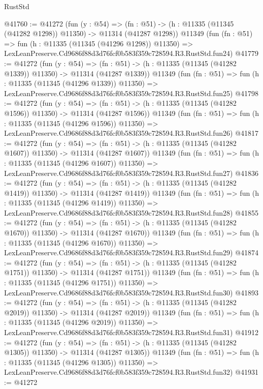 \begin{lexlean}{RustStd}
\begin{coremodule}
@41760 := @41272
    (fun (y : @54) =>
    (fn : @51) -> (h : @11335 (@11345 (@41282 @1298)) @11350) -> @11314 (@41287 @1298))
    @11349
    (fun (fn : @51) =>
    fun (h : @11335 (@11345 (@41296 @1298)) @11350) =>
    LexLeanPreserve.Cd9686f88d3d76fcf0b583f359c728594.R3.RustStd.fun24)
@41779 := @41272
    (fun (y : @54) =>
    (fn : @51) -> (h : @11335 (@11345 (@41282 @1339)) @11350) -> @11314 (@41287 @1339))
    @11349
    (fun (fn : @51) =>
    fun (h : @11335 (@11345 (@41296 @1339)) @11350) =>
    LexLeanPreserve.Cd9686f88d3d76fcf0b583f359c728594.R3.RustStd.fun25)
@41798 := @41272
    (fun (y : @54) =>
    (fn : @51) -> (h : @11335 (@11345 (@41282 @1596)) @11350) -> @11314 (@41287 @1596))
    @11349
    (fun (fn : @51) =>
    fun (h : @11335 (@11345 (@41296 @1596)) @11350) =>
    LexLeanPreserve.Cd9686f88d3d76fcf0b583f359c728594.R3.RustStd.fun26)
@41817 := @41272
    (fun (y : @54) =>
    (fn : @51) -> (h : @11335 (@11345 (@41282 @1607)) @11350) -> @11314 (@41287 @1607))
    @11349
    (fun (fn : @51) =>
    fun (h : @11335 (@11345 (@41296 @1607)) @11350) =>
    LexLeanPreserve.Cd9686f88d3d76fcf0b583f359c728594.R3.RustStd.fun27)
@41836 := @41272
    (fun (y : @54) =>
    (fn : @51) -> (h : @11335 (@11345 (@41282 @1419)) @11350) -> @11314 (@41287 @1419))
    @11349
    (fun (fn : @51) =>
    fun (h : @11335 (@11345 (@41296 @1419)) @11350) =>
    LexLeanPreserve.Cd9686f88d3d76fcf0b583f359c728594.R3.RustStd.fun28)
@41855 := @41272
    (fun (y : @54) =>
    (fn : @51) -> (h : @11335 (@11345 (@41282 @1670)) @11350) -> @11314 (@41287 @1670))
    @11349
    (fun (fn : @51) =>
    fun (h : @11335 (@11345 (@41296 @1670)) @11350) =>
    LexLeanPreserve.Cd9686f88d3d76fcf0b583f359c728594.R3.RustStd.fun29)
@41874 := @41272
    (fun (y : @54) =>
    (fn : @51) -> (h : @11335 (@11345 (@41282 @1751)) @11350) -> @11314 (@41287 @1751))
    @11349
    (fun (fn : @51) =>
    fun (h : @11335 (@11345 (@41296 @1751)) @11350) =>
    LexLeanPreserve.Cd9686f88d3d76fcf0b583f359c728594.R3.RustStd.fun30)
@41893 := @41272
    (fun (y : @54) =>
    (fn : @51) -> (h : @11335 (@11345 (@41282 @2019)) @11350) -> @11314 (@41287 @2019))
    @11349
    (fun (fn : @51) =>
    fun (h : @11335 (@11345 (@41296 @2019)) @11350) =>
    LexLeanPreserve.Cd9686f88d3d76fcf0b583f359c728594.R3.RustStd.fun31)
@41912 := @41272
    (fun (y : @54) =>
    (fn : @51) -> (h : @11335 (@11345 (@41282 @1305)) @11350) -> @11314 (@41287 @1305))
    @11349
    (fun (fn : @51) =>
    fun (h : @11335 (@11345 (@41296 @1305)) @11350) =>
    LexLeanPreserve.Cd9686f88d3d76fcf0b583f359c728594.R3.RustStd.fun32)
@41931 := @41272

\end{coremodule}
\end{lexlean}
